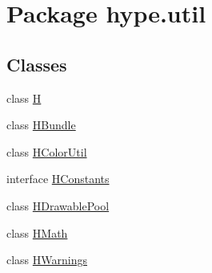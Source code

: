 \hypertarget{namespacehype_1_1util}{\section{Package hype.\-util}
\label{namespacehype_1_1util}
}
\subsection*{Classes}
\begin{DoxyCompactItemize}
\item 
class \hyperlink{classhype_1_1util_1_1_h}{H}
\item 
class \hyperlink{classhype_1_1util_1_1_h_bundle}{H\-Bundle}
\item 
class \hyperlink{classhype_1_1util_1_1_h_color_util}{H\-Color\-Util}
\item 
interface \hyperlink{interfacehype_1_1util_1_1_h_constants}{H\-Constants}
\item 
class \hyperlink{classhype_1_1util_1_1_h_drawable_pool}{H\-Drawable\-Pool}
\item 
class \hyperlink{classhype_1_1util_1_1_h_math}{H\-Math}
\item 
class \hyperlink{classhype_1_1util_1_1_h_warnings}{H\-Warnings}
\end{DoxyCompactItemize}
